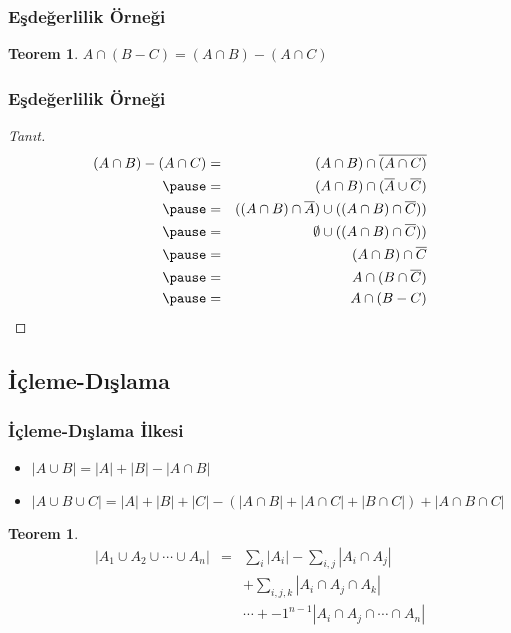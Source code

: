 \documentclass[dvipsnames]{beamer}
\theoremstyle{definition}
\theoremstyle{example}
\theoremstyle{plain}
\newtheorem{teorem}[theorem]{Teorem}
\begin{document}
\begin{frame}
  \frametitle{Eşdeğerlilik Örneği}

  \begin{teorem}
    $A \cap (B-C) = (A \cap B) - (A \cap C)$
  \end{teorem}
\end{frame}

\begin{frame}
  \frametitle{Eşdeğerlilik Örneği}

  \begin{proof}[Tanıt]
    \begin{eqnarray*}
      (A \cap B) - (A \cap C)
          & = & (A \cap B) \cap \overline{(A \cap C)}\\\pause
          & = & (A \cap B) \cap (\overline{A} \cup \overline{C})\\\pause
          & = & ((A \cap B) \cap \overline{A}) \cup ((A \cap B) \cap \overline{C}))\\\pause
          & = & \emptyset \cup ((A \cap B) \cap \overline{C}))\\\pause
          & = & (A \cap B) \cap \overline{C}\\\pause
          & = & A \cap (B \cap \overline{C})\\\pause
          & = & A \cap (B - C)
    \end{eqnarray*}
  \end{proof}
\end{frame}

\subsection{İçleme-Dışlama}

\begin{frame}
  \frametitle{İçleme-Dışlama İlkesi}

  \begin{itemize}
    \item $|A \cup B| = |A| + |B| - |A \cap B|$

    \pause
    \item $|A \cup B \cup C| = |A| + |B| + |C|
      - (|A \cap B| + |A \cap C| + |B \cap C|)
      + |A \cap B \cap C|$
  \end{itemize}

  \pause
  \begin{teorem}
    \begin{eqnarray*}
      |A_1 \cup A_2 \cup \cdots \cup A_n| & = & \sum_i{|A_i|}
          - \sum_{i,j}{|A_i \cap A_j|}\\
      & & + \sum_{i,j,k}{|A_i \cap A_j \cap A_k|}\\
      & & \cdots + -1^{n-1} {|A_i \cap A_j \cap \cdots \cap A_n|}
    \end{eqnarray*}
  \end{teorem}
\end{frame}
\end{document}
